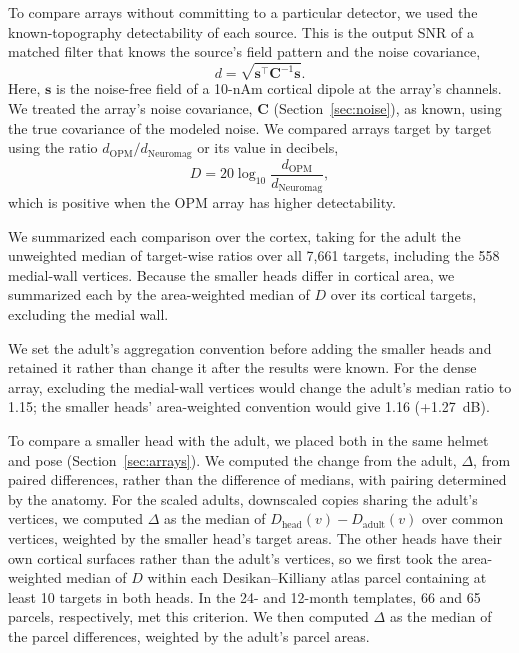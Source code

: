 \documentclass[preprint,12pt,authoryear,a4paper]{elsarticle}
\begin{document}
To compare arrays without committing to a particular detector, we used the known-topography detectability of each source. This is the output SNR of a matched filter that knows the source's field pattern and the noise covariance,
\begin{equation}
d = \sqrt{\symbf{s}^{\top}\symbf{C}^{-1}\symbf{s}}.
\label{eq:d}
\end{equation}
Here, $\symbf{s}$ is the noise-free field of a 10-nAm cortical dipole at the array's channels. We treated the array's noise covariance, $\symbf{C}$ (Section~\ref{sec:noise}), as known, using the true covariance of the modeled noise. We compared arrays target by target using the ratio $d_{\mathrm{OPM}}/d_{\mathrm{Neuromag}}$ or its value in decibels,
\begin{equation}
D = 20\log_{10}\frac{d_{\mathrm{OPM}}}{d_{\mathrm{Neuromag}}},
\label{eq:D}
\end{equation}
which is positive when the OPM array has higher detectability.

We summarized each comparison over the cortex, taking for the adult the unweighted median of target-wise ratios over all 7,661 targets, including the 558 medial-wall vertices. Because the smaller heads differ in cortical area, we summarized each by the area-weighted median of $D$ over its cortical targets, excluding the medial wall.

We set the adult's aggregation convention before adding the smaller heads and retained it rather than change it after the results were known. For the dense array, excluding the medial-wall vertices would change the adult's median ratio to 1.15; the smaller heads' area-weighted convention would give 1.16 (+1.27~dB).

To compare a smaller head with the adult, we placed both in the same helmet and pose (Section~\ref{sec:arrays}). We computed the change from the adult, $\Delta$, from paired differences, rather than the difference of medians, with pairing determined by the anatomy. For the scaled adults, downscaled copies sharing the adult's vertices, we computed $\Delta$ as the median of $D_{\mathrm{head}}(v) - D_{\mathrm{adult}}(v)$ over common vertices, weighted by the smaller head's target areas. The other heads have their own cortical surfaces rather than the adult's vertices, so we first took the area-weighted median of $D$ within each Desikan--Killiany atlas parcel containing at least 10 targets in both heads. In the 24- and 12-month templates, 66 and 65 parcels, respectively, met this criterion. We then computed $\Delta$ as the median of the parcel differences, weighted by the adult's parcel areas.
\end{document}
